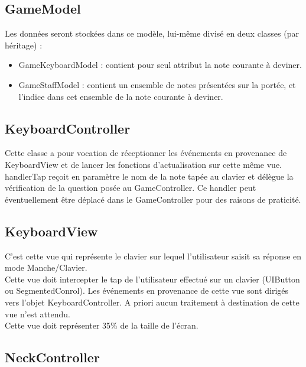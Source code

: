 \documentclass{scrreprt}
\begin{document}
\subsection{GameModel}

Les données seront stockées dans ce modèle, lui-même divisé en deux classes (par héritage) :
\begin{itemize}
\item GameKeyboardModel : contient pour seul attribut la note courante à deviner.
\item GameStaffModel : contient un ensemble de notes présentées sur la portée, et l'indice dans cet ensemble de la note courante à deviner.
\end{itemize}

\subsection{KeyboardController}

Cette classe a pour vocation de réceptionner les événements en provenance de KeyboardView et de lancer les fonctions d’actualisation sur cette même vue.\\
handlerTap reçoit en paramètre le nom de la note tapée au clavier et délègue la vérification de la question posée au GameController. Ce handler peut éventuellement être déplacé dans le GameController pour des raisons de praticité.


\subsection{KeyboardView}
C’est cette vue qui représente le clavier sur lequel l’utilisateur saisit sa réponse en mode Manche/Clavier.\\
Cette vue doit intercepter le tap de l’utilisateur effectué sur un clavier (UIButton
ou SegmentedConrol). Les événements en provenance de cette vue sont dirigés vers l’objet KeyboardController.
A priori aucun traitement à destination de cette vue n’est attendu.\\
Cette vue doit représenter 35\% de la taille de l’écran.


\subsection{NeckController}
\end{document}
